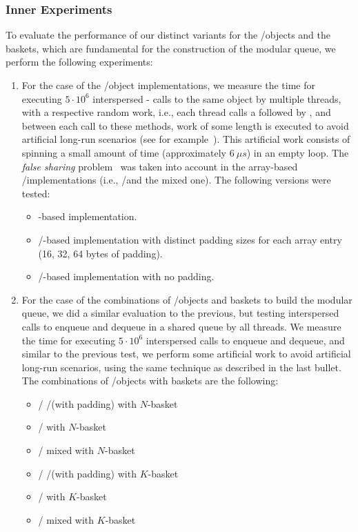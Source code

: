 \subsubsection{\label{subsubsec:queue-experiments-inner-experiments}Inner Experiments}

To evaluate the performance of our distinct variants for the \LL/\IC objects and the baskets, which are fundamental for the construction of the modular queue, we perform the following experiments:

\begin{enumerate}
    \item For the case of the \LL/\IC object implementations, we measure the time for executing \(5 \cdot 10^6\) interspersed \LL - \IC calls to the same object by multiple threads, with a respective random work, i.e., each thread calls a \LL followed by \IC, and between each call to these methods, work of some length is executed to avoid artificial long-run scenarios (see for example~\cite{DBLP_conf_ppopp_YangM16}). This artificial work consists of spinning a small amount of time (approximately \(6\ \mu{}s\)) in an empty loop. The \emph{false sharing} problem~\cite{BoloskyMichael93} was taken into account in the array-based \LL/\IC implementations (i.e., \R/\W and the mixed one). The following versions were tested:

    \begin{itemize}
        \item \CAS-based implementation.
        \item \R/\W-based implementation with distinct padding sizes for each array entry (16, 32, 64 bytes of padding).
        \item \R/\W-based implementation with no padding.
    \end{itemize}

    \item For the case of the combinations of \LL/\IC objects and baskets to build the modular queue, we did a similar evaluation to the previous, but testing interspersed calls to enqueue and dequeue in a shared queue by all threads. We measure the time for executing \(5\cdot 10^6\) interspersed calls to enqueue and dequeue, and similar to the previous test, we perform some artificial work to avoid artificial long-run scenarios, using the same technique as described in the last bullet. The combinations of \LL/\IC objects with baskets are the following:
    \begin{itemize}
        \item \LL/\IC{} \R/\W (with padding) with \(N\)-basket
        \item \LL/\IC{} \CAS with \(N\)-basket
        \item \LL/\IC{} mixed with \(N\)-basket
        \item \LL/\IC{} \R/\W (with padding) with \(K\)-basket
        \item \LL/\IC{} \CAS with \(K\)-basket
        \item \LL/\IC{} mixed with \(K\)-basket
    \end{itemize}
\end{enumerate}



